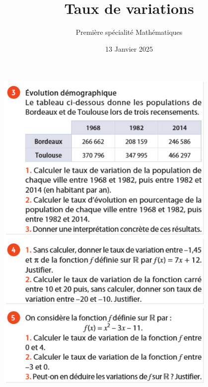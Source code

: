 \documentclass{article}
\title{Taux de variations}
\author{Première spécialité Mathématiques}
\date{13 Janvier 2025}
\begin{document}
\maketitle

\begin{center}
\includegraphics[width=0.8\textwidth]{Exercices_taux_variation.png}
\end{center}
\end{document}
